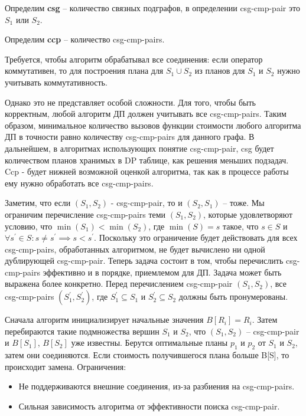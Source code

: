 \documentclass[12pt]{article}
\begin{document}
\begin{flushleft}
Определим \textbf{csg} -- количество связных подграфов, в определении 
csg-cmp-pair это $S_1$ или $S_2$.
\newline

Определим \textbf{ccp} -- количество csg-cmp-pairs.
\newline

Требуется, чтобы алгоритм обрабатывал все соединения: если 
оператор коммутативен, то для построения плана для $ S_ 1 \cup S_2$ 
из планов для $S_1$ и $S_2$ нужно учитывать коммутативность.

Однако это не представляет особой сложности. Для того, 
чтобы быть корректным, любой алгоритм ДП должен учитывать все csg-cmp-pairs. 
Таким образом, минимальное 
количество вызовов функции стоимости любого алгоритма ДП в точности равно 
количеству csg-cmp-pairs для данного графа. В дальнейшем, в алгоритмах использующих понятие csg-cmp-pair, 
csg будет количеством планов хранимых в DP таблице, как решения 
меньших подзадач. Ccp - будет нижней возможной оценкой алгоритма, 
так как в процессе работы ему нужно обработать все csg-cmp-pairs.
\newline

Заметим, что если $(S_1, S_2)$ - csg-cmp-pair, то и $(S_2, S_1)$
-- тоже. Мы ограничим перечисление csg-cmp-pairs теми $(S_1, S_2)$, 
которые удовлетворяют условию, что $\min(S_1) < \min(S_2)$, 
где $\min(S) = s$ такое, что 
$s \in S$ и $\forall  s^{'} \in  S : s \neq s^{'} \implies  s < s^{'}$. 
Поскольку это ограничение будет действовать для всех csg-cmp-pairs, обработанных алгоритмом, 
не будет вычислено ни одной дублирующей csg-cmp-pair. 
\newline
Теперь задача состоит в том, чтобы перечислить csg-cmp-pairs 
эффективно и в порядке, приемлемом для ДП. 
Задача может быть выражена более конкретно. Перед перечислением csg-cmp-pair $(S_1, S_2)$, 
все csg-cmp-pairs $(S^{'}_1, S^{'}_2)$, где $S^{'}_1 \subseteq  S_1$ 
и $S^{'}_2 \subseteq  S_2$ должны быть пронумерованы.

Сначала алгоритм инициализирует начальные значения $B[{R_i}] = R_i$.
Затем перебираются такие подмножества вершин $S_1$ и $S_2$, 
что $(S_1, S_2)$ -- csg-cmp-pair и $B[S_1]$, $B[S_2]$ уже известны. 
Берутся оптимальные планы $p_1$ и $p_2$ от $S_1$ и $S_2$, затем они 
соединяются. Если стоимость получившегося плана больше B[S], то 
происходит замена. Ограничения:
\begin{itemize}
    \item Не поддерживаются внешние соединения, из-за разбиения на csg-cmp-pairs.
    \item Сильная зависимость алгоритма от эффективности поиска csg-cmp-pair.
\end{itemize}


\end{flushleft}
\end{document}
